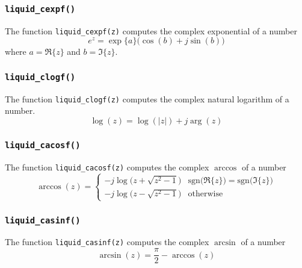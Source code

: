 \subsubsection{{\tt liquid\_cexpf()}}
\label{module:math:complex:cexpf}
The function {\tt liquid\_cexpf(z)}
computes the complex exponential of a number
%
\begin{equation}
\label{eqn:math:cexpf}
    e^{z} = \exp\bigl\{a\bigr\}
            \bigl(
                \cos(b) + j\sin(b)
            \bigr)
\end{equation}
%
where $a=\Re\{z\}$ and $b=\Im\{z\}$.


\subsubsection{{\tt liquid\_clogf()}}
\label{module:math:complex:clogf}
The function {\tt liquid\_clogf(z)}
computes the complex natural logarithm of a number.
%
\begin{equation}
\label{eqn:math:clogf}
    \log(z) =   \log(|z|) + j\arg(z)
\end{equation}
%


\subsubsection{{\tt liquid\_cacosf()}}
\label{module:math:complex:cacosf}
The function {\tt liquid\_cacosf(z)}
computes the complex $\arccos$ of a number
%
\begin{equation}
\label{eqn:math:cacosf}
    \arccos(z) =
        \begin{cases}
        -j \log\bigl( z + \sqrt{z^2 - 1} \bigr) &
            \text{sgn}\bigl(\Re\{z\}\bigr) =
            \text{sgn}\bigl(\Im\{z\}\bigr) \\
        -j \log\bigl( z - \sqrt{z^2 - 1} \bigr) & \text{otherwise}
        \end{cases}
\end{equation}
%


\subsubsection{{\tt liquid\_casinf()}}
\label{module:math:complex:casinf}
The function {\tt liquid\_casinf(z)}
computes the complex $\arcsin$ of a number
%
\begin{equation}
\label{eqn:math:casinf}
    \arcsin(z) = \frac{\pi}{2} - \arccos(z)
\end{equation}
%



